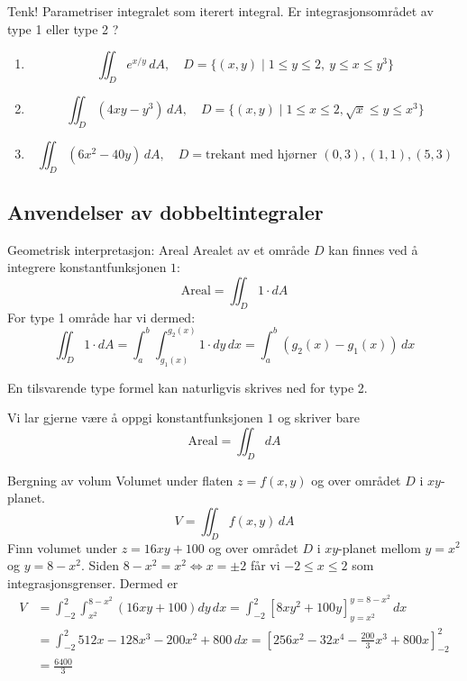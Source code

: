 \begin{eks}{Tenk!}
Parametriser integralet som iterert integral. Er integrasjonsområdet av type 1 eller type 2 ? 
\begin{enumerate}
  \item \[
    \iint_D e^{x/y}\, dA, \quad D = \{ (x, y) \mid 1 \leq y \leq 2, \ y \leq x \leq y^3 \}
  \]
  \item \[
    \iint_D (4xy - y^3)\, dA, \quad D =\{(x,y) \mid 1 \leq x \leq  2,  \sqrt{x} \leq  y \leq  x^3\}
  \]
  \item \[
    \iint_D (6x^2 - 40y)\, dA, \quad D = \textrm{trekant med hjørner } (0, 3), (1, 1), (5, 3)
  \]
\end{enumerate}
\end{eks}

\subsection{Anvendelser av dobbeltintegraler}

\begin{oppsum}{Geometrisk interpretasjon: Areal}
Arealet av et område \( D \) kan finnes ved å integrere konstantfunksjonen $1$:
\[
\text{Areal} = \iint_D 1\cdot dA
\]
For type 1 område har vi dermed:
\[
\iint_D 1\cdot dA = \int_a^b \int_{g_1(x)}^{g_2(x)} 1\cdot dy\, dx = \int_a^b (g_2(x) - g_1(x))\, dx
\]

En tilsvarende type formel kan naturligvis skrives ned for type 2.

Vi lar gjerne være å oppgi konstantfunksjonen $1$ og skriver bare
\[
\text{Areal} = \iint_D dA
\]
\end{oppsum}

\begin{eks}{Bergning av volum}{}
Volumet under flaten \( z = f(x, y) \) og over området \( D \) i \( xy \)-planet.
\[
V = \iint_D f(x, y)\, dA
\]
Finn volumet under \( z = 16xy + 100 \) og over området $D$ i $xy$-planet mellom \( y= x^2 \) og \(y= 8 - x^2 \). Siden $8-x^2=x^2 \Leftrightarrow x=\pm 2$ får vi \( -2 \leq x \leq 2 \) som integrasjonsgrenser. Dermed er 
\begin{align*}
V &= \int_{-2}^{2} \int_{x^2}^{8 - x^2} (16xy + 100) dy\, dx = \int_{-2}^{2}\left[8xy^2+100y\right]_{y=x^2}^{y=8-x^2}\,dx \\ 
&= \int_{-2}^2 512x-128x^3-200x^2+800\, dx = \left[256x^2-32x^4-\frac{200}{3}x^3+800x\right]_{-2}^2 \\ &= \frac{6400}{3}
\end{align*}
\end{eks}


